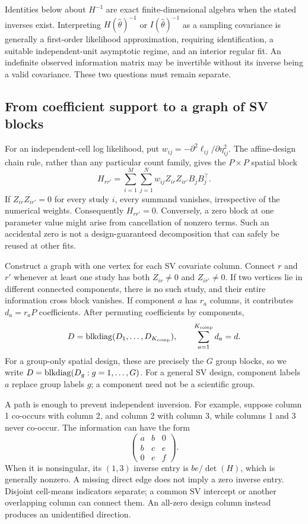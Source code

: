 Identities below about $H^{-1}$ are exact finite-dimensional algebra when
the stated inverses exist.  Interpreting $H(\widehat\theta)^{-1}$ or
$I(\widehat\theta)^{-1}$ as a sampling covariance is generally a
first-order likelihood approximation, requiring identification, a suitable
independent-unit asymptotic regime, and an interior regular fit.
An indefinite observed information matrix may be invertible without its
inverse being a valid covariance.  These two questions must remain separate.

\subsection{From coefficient support to a graph of SV blocks}
\label{cov-support-graph}

For an independent-cell log likelihood, put
$w_{ij}=-\partial^2\ell_{ij}/\partial\eta_{ij}^2$.
The affine-design chain rule, rather than any particular count family,
gives the $P\times P$ spatial block
\begin{equation}
 H_{rr'}=\sum_{i=1}^M\sum_{j=1}^N
             w_{ij}Z_{ir}Z_{ir'}B_jB_j^\top .
 \label{cov-sv-block}
\end{equation}
If $Z_{ir}Z_{ir'}=0$ for every study $i$, every summand vanishes,
irrespective of the numerical weights.  Consequently $H_{rr'}=0$.
Conversely, a zero block at one parameter value might arise from
cancellation of nonzero terms.  Such an accidental zero is not a
design-guaranteed decomposition that can safely be reused at other fits.

Construct a graph with one vertex for each SV covariate column.  Connect
$r$ and $r'$ whenever at least one study has both $Z_{ir}\ne0$ and
$Z_{ir'}\ne0$.  If two vertices lie in different connected components,
there is no such study, and their entire information cross block vanishes.
If component $a$ has $r_a$ columns, it contributes $d_a=r_aP$
coefficients.  After permuting coefficients by components,
\begin{equation}
 D=\operatorname{blkdiag}(D_1,\ldots,D_{K_{\mathrm{comp}}}),\qquad
 \sum_{a=1}^{K_{\mathrm{comp}}}d_a=d.
 \label{cov-component-blocks}
\end{equation}
For a group-only spatial design, these are precisely the $G$ group
blocks, so we write $D=\operatorname{blkdiag}(D_g:g=1,\ldots,G)$.
For a general SV design, component labels $a$ replace group labels $g$;
a component need not be a scientific group.

A path is enough to prevent independent inversion.  For example, suppose
column 1 co-occurs with column 2, and column 2 with column 3, while
columns 1 and 3 never co-occur.  The information can have the form
\[
 \begin{pmatrix} a&b&0\\b&c&e\\0&e&f\end{pmatrix}.
\]
When it is nonsingular, its $(1,3)$ inverse entry is
$be/\det(H)$, which is generally nonzero.  A missing direct edge does
not imply a zero inverse entry.  Disjoint cell-means indicators separate;
a common SV intercept or another overlapping column can connect them.
An all-zero design column instead produces an unidentified direction.

